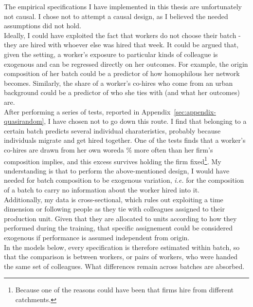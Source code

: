 
\noindent The empirical specifications I have implemented in this thesis are unfortunately not causal. I chose not to attempt a causal design, as I believed the needed assumptions did not hold. \\

\noindent Ideally, I could have exploited the fact that workers do not choose their batch - they are hired with whoever else was hired that week. It could be argued that, given the setting, a worker's exposure to particular kinds of colleague is exogenous and can be regressed directly on her outcomes. For example, the origin composition of her batch could be a predictor of how homophilous her network becomes. Similarly, the share of a worker's co-hires who come from an urban background could be a predictor of who she ties with (and what her outcomes) are. \\

\noindent After performing a series of tests, reported in Appendix~\ref{sec:appendix-quasirandom}, I have chosen not to go down this route. I find that belonging to a certain batch predicts several individual charateristics, probably because individuals migrate and get hired together. One of the tests finds that a worker's co-hires are drawn from her own woreda \pnWoredaExcessPct{}\% more often than her firm's composition implies, and this excess survives holding the firm fixed\footnote{Because one of the reasons could have been that firms hire from different catchments.}. My understanding is that to perform the above-mentioned design, I would have needed for batch composition to be exogenous variation, \textit{i.e.} for the composition of a batch to carry no information about the worker hired into it. \\

\noindent Additionally, my data is cross-sectional, which rules out exploiting a time dimension or following people as they tie with colleagues assigned to their production unit. Given that they are allocated to units according to how they performed during the training, that specific assignement could be considered exogenous if performance is assumed independent from origin. \\

\noindent In the models below, every specification is therefore estimated within batch, so that the comparison is between workers, or pairs of workers, who were handed the same set of colleagues. What differences remain across batches are absorbed. \\

